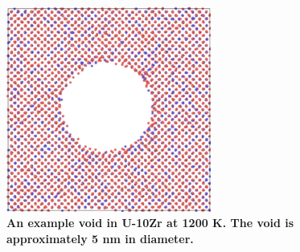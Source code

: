 \documentclass[review]{elsarticle}
\providecommand{\DIFaddtex}[1]{{\bf #1}} %
\providecommand{\DIFaddFL}[1]{\DIFadd{#1}} %
\providecommand{\DIFadd}[1]{\texorpdfstring{\DIFaddtex{#1}}{#1}} %
\begin{document}
\begin{figure}[!htp]
\begin{center}
\includegraphics[width=0.6\textwidth]{7_void}
\end{center}
\caption{\DIFaddFL{An example void in U-10Zr at 1200 K. The void is approximately 5 nm in diameter. }}
\label{fig:void}
\end{figure}

\FloatBarrier
\end{document}
